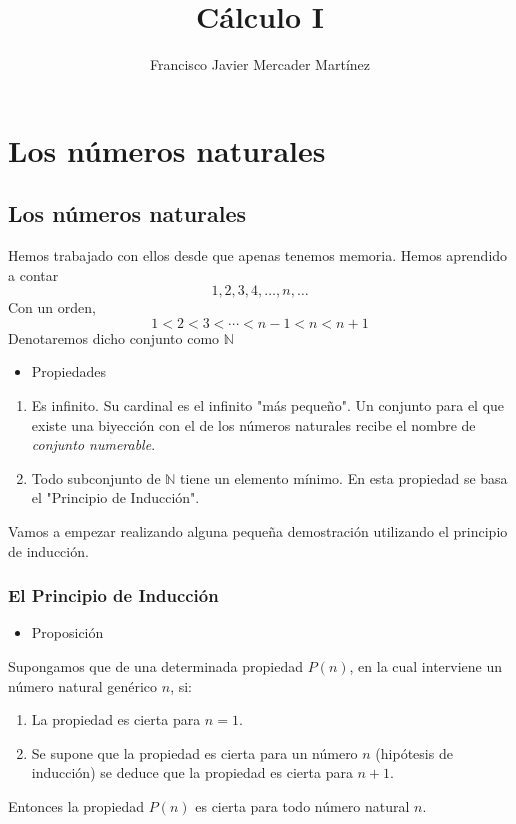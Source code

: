 \documentclass[12pt]{article}
\title{Cálculo I}
\author{Francisco Javier Mercader Martínez}
\date{}
\begin{document}
\maketitle
{ \tableofcontents}
\newpage
\section{Los números naturales}

\subsection{Los números naturales}

Hemos trabajado con ellos desde que apenas tenemos memoria. Hemos aprendido a contar \[ 1,2,3,4,\hdots,n,\hdots\]
Con un orden, \[ 1<2<3<\cdots<n-1<n<n+1 \]
Denotaremos dicho conjunto como $\mathbb{N}$
\begin{itemize}[label=\color{red}\textbullet, leftmargin=*]
	\item \color{lightblue} Propiedades
\end{itemize}
\begin{enumerate}[label=\arabic*)]
	\item Es infinito. Su cardinal es el infinito "más pequeño". Un conjunto para el que existe una biyección con el de los números naturales recibe el nombre de \textit{conjunto numerable}.
	\item Todo subconjunto de $\mathbb{N}$ tiene un elemento mínimo. En esta propiedad se basa el "Principio de Inducción".
\end{enumerate}
Vamos a empezar realizando alguna pequeña demostración utilizando el principio de inducción.
\subsubsection{El Principio de Inducción}
\begin{itemize}[label=\color{red}\textbullet, leftmargin=*]
	\item \color{lightblue} Proposición
\end{itemize}
Supongamos que de una determinada propiedad $P(n)$, en la cual interviene un número natural genérico $n$, si:
\begin{enumerate}[label=\arabic*)]
	\item La propiedad es cierta para $n=1$.
	\item Se supone que la propiedad es cierta para un número $n$ (hipótesis de inducción) se deduce que la propiedad es cierta para $n+1$.
\end{enumerate}
Entonces la propiedad $P(n)$ es cierta para todo número natural $n$.
\end{document}
